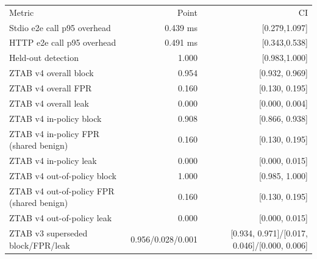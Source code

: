 \begin{tabular}{lrr}
Metric & Point & CI \\
Stdio e2e call p95 overhead & 0.439 ms & [0.279,1.097] \\
HTTP e2e call p95 overhead & 0.491 ms & [0.343,0.538] \\
Held-out detection & 1.000 & [0.983,1.000] \\
ZTAB v4 overall block & 0.954 & [0.932, 0.969] \\
ZTAB v4 overall FPR & 0.160 & [0.130, 0.195] \\
ZTAB v4 overall leak & 0.000 & [0.000, 0.004] \\
ZTAB v4 in-policy block & 0.908 & [0.866, 0.938] \\
ZTAB v4 in-policy FPR (shared benign) & 0.160 & [0.130, 0.195] \\
ZTAB v4 in-policy leak & 0.000 & [0.000, 0.015] \\
ZTAB v4 out-of-policy block & 1.000 & [0.985, 1.000] \\
ZTAB v4 out-of-policy FPR (shared benign) & 0.160 & [0.130, 0.195] \\
ZTAB v4 out-of-policy leak & 0.000 & [0.000, 0.015] \\
ZTAB v3 superseded block/FPR/leak & 0.956/0.028/0.001 & [0.934, 0.971]/[0.017, 0.046]/[0.000, 0.006] \\
\end{tabular}
